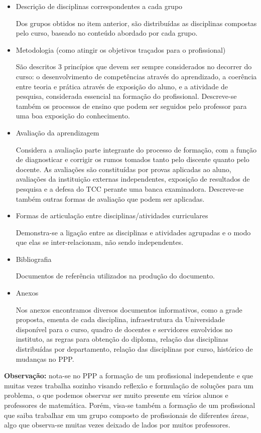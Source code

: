 \documentclass[a4paper]{article}
\begin{document}
\begin{itemize}
\item Descrição de disciplinas correspondentes a cada grupo

Dos grupos obtidos no item anterior, são distribuídas as disciplinas compostas pelo curso, baseado no conteúdo abordado por cada grupo.

\item Metodologia (como atingir os objetivos traçados para o profissional)

São descritos 3 princípios que devem ser sempre considerados no decorrer do curso: o desenvolvimento de competências através do aprendizado, a coerência entre teoria e prática através de exposição do aluno, e a atividade de pesquisa, considerada essencial na formação do profissional. Descreve-se também os processos de ensino que podem ser seguidos pelo professor para uma boa exposição do conhecimento.

\item Avaliação da aprendizagem

Considera a avaliação parte integrante do processo de formação, com a função de diagnosticar e corrigir os rumos tomados tanto pelo discente quanto pelo docente. As avaliações são constituídas por provas aplicadas ao aluno, avaliações da instituição externas independentes, exposição de resultados de pesquisa e a defesa do TCC perante uma banca examinadora. Descreve-se também outras formas de avaliação que podem ser aplicadas.

\item Formas de articulação entre disciplinas/atividades curriculares

Demonstra-se a ligação entre as disciplinas e atividades agrupadas e o modo que elas se inter-relacionam, não sendo independentes.

\item Bibliografia

Documentos de referência utilizados na produção do documento.

\item Anexos

Nos anexos encontramos diversos documentos informativos, como a grade proposta, ementa de cada disciplina, infraestrutura da Universidade disponível para o curso, quadro de docentes e servidores envolvidos no instituto, as regras para obtenção do diploma, relação das disciplinas distribuídas por departamento, relação das disciplinas por curso, histórico de mudanças no PPP.
\end{itemize}

{\bf Observação:} nota-se no PPP a formação de um profissional independente e que muitas vezes trabalha sozinho visando reflexão e formulação de soluções para um problema, o que podemos observar ser muito presente em vários alunos e professores de matemática. Porém, visa-se também a formação de um profissional que saiba trabalhar em um grupo composto de profissionais de diferentes áreas, algo que observa-se muitas vezes deixado de lados por muitos professores.
\end{document}
